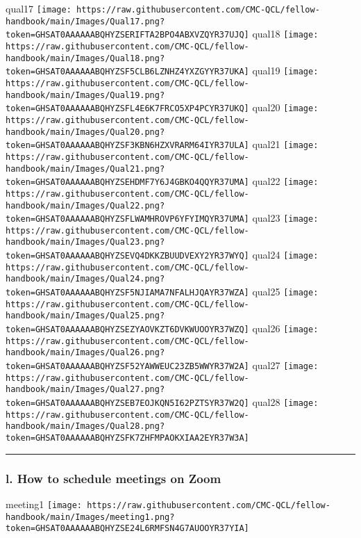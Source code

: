 \documentclass[
]{book}
\begin{document}
qual17
\texttt{[image: https://raw.githubusercontent.com/CMC-QCL/fellow-handbook/main/Images/Qual17.png?token=GHSAT0AAAAAABQHYZSERIFTA2BPO4ABXVZQYR37UJQ]}
qual18
\texttt{[image: https://raw.githubusercontent.com/CMC-QCL/fellow-handbook/main/Images/Qual18.png?token=GHSAT0AAAAAABQHYZSF5CLB6LZNHZ4YXZGYYR37UKA]}
qual19
\texttt{[image: https://raw.githubusercontent.com/CMC-QCL/fellow-handbook/main/Images/Qual19.png?token=GHSAT0AAAAAABQHYZSFL4E6K7FRCO5XP4PCYR37UKQ]}
qual20
\texttt{[image: https://raw.githubusercontent.com/CMC-QCL/fellow-handbook/main/Images/Qual20.png?token=GHSAT0AAAAAABQHYZSF3KBN6HZXVRARM64IYR37ULA]}
qual21
\texttt{[image: https://raw.githubusercontent.com/CMC-QCL/fellow-handbook/main/Images/Qual21.png?token=GHSAT0AAAAAABQHYZSEHDMF7Y6J4GBKO4QQYR37UMA]}
qual22
\texttt{[image: https://raw.githubusercontent.com/CMC-QCL/fellow-handbook/main/Images/Qual22.png?token=GHSAT0AAAAAABQHYZSFLWAMHROVP6YFYIMQYR37UMA]}
qual23
\texttt{[image: https://raw.githubusercontent.com/CMC-QCL/fellow-handbook/main/Images/Qual23.png?token=GHSAT0AAAAAABQHYZSEVQ4DKKZBUUDVEXY2YR37WYQ]}
qual24
\texttt{[image: https://raw.githubusercontent.com/CMC-QCL/fellow-handbook/main/Images/Qual24.png?token=GHSAT0AAAAAABQHYZSF5NJIAMA7NFALHJQAYR37WZA]}
qual25
\texttt{[image: https://raw.githubusercontent.com/CMC-QCL/fellow-handbook/main/Images/Qual25.png?token=GHSAT0AAAAAABQHYZSEZYAOVKZT6DVKWUOOYR37WZQ]}
qual26
\texttt{[image: https://raw.githubusercontent.com/CMC-QCL/fellow-handbook/main/Images/Qual26.png?token=GHSAT0AAAAAABQHYZSF52YAWWEUC23ZB5WWYR37W2A]}
qual27
\texttt{[image: https://raw.githubusercontent.com/CMC-QCL/fellow-handbook/main/Images/Qual27.png?token=GHSAT0AAAAAABQHYZSEB7EOJKQN5I62PZTSYR37W2Q]}
qual28
\texttt{[image: https://raw.githubusercontent.com/CMC-QCL/fellow-handbook/main/Images/Qual28.png?token=GHSAT0AAAAAABQHYZSFK7ZHFMPAOKXIAA2EYR37W3A]}

\begin{center}\rule{0.5\linewidth}{0.5pt}\end{center}

\hypertarget{l.-how-to-schedule-meetings-on-zoom}{%
\subsubsection{\texorpdfstring{l. How to schedule meetings on Zoom }{l. How to schedule meetings on Zoom }}\label{l.-how-to-schedule-meetings-on-zoom}}

meeting1
\texttt{[image: https://raw.githubusercontent.com/CMC-QCL/fellow-handbook/main/Images/meeting1.png?token=GHSAT0AAAAAABQHYZSE24L6RMFSN4G7AUOOYR37YIA]}
\end{document}
